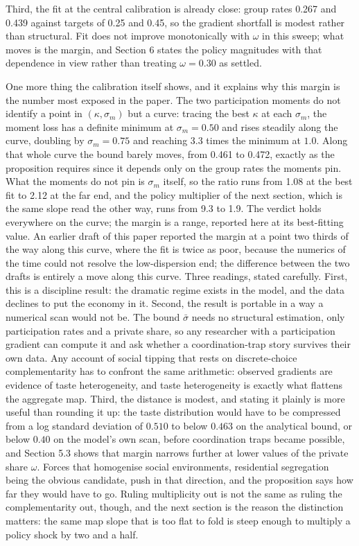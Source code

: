 \documentclass[11pt]{article}
\begin{document}
Third, the fit at the central calibration is already close: group rates 0.267 and 0.439 against targets of 0.25 and 0.45, so the gradient shortfall is modest rather than structural. Fit does not improve monotonically with $\omega$ in this sweep; what moves is the margin, and Section 6 states the policy magnitudes with that dependence in view rather than treating $\omega = 0.30$ as settled.

One more thing the calibration itself shows, and it explains why this margin is the number most exposed in the paper. The two participation moments do not identify a point in $(\kappa, \sigma_m)$ but a curve: tracing the best $\kappa$ at each $\sigma_m$, the moment loss has a definite minimum at $\sigma_m = 0.50$ and rises steadily along the curve, doubling by $\sigma_m = 0.75$ and reaching 3.3 times the minimum at $1.0$. Along that whole curve the bound barely moves, from 0.461 to 0.472, exactly as the proposition requires since it depends only on the group rates the moments pin. What the moments do not pin is $\sigma_m$ itself, so the ratio runs from 1.08 at the best fit to 2.12 at the far end, and the policy multiplier of the next section, which is the same slope read the other way, runs from 9.3 to 1.9. The verdict holds everywhere on the curve; the margin is a range, reported here at its best-fitting value. An earlier draft of this paper reported the margin at a point two thirds of the way along this curve, where the fit is twice as poor, because the numerics of the time could not resolve the low-dispersion end; the difference between the two drafts is entirely a move along this curve. Three readings, stated carefully. First, this is a discipline result: the dramatic regime exists in the model, and the data declines to put the economy in it. Second, the result is portable in a way a numerical scan would not be. The bound $\bar\sigma$ needs no structural estimation, only participation rates and a private share, so any researcher with a participation gradient can compute it and ask whether a coordination-trap story survives their own data. Any account of social tipping that rests on discrete-choice complementarity has to confront the same arithmetic: observed gradients are evidence of taste heterogeneity, and taste heterogeneity is exactly what flattens the aggregate map. Third, the distance is modest, and stating it plainly is more useful than rounding it up: the taste distribution would have to be compressed from a log standard deviation of $0.510$ to below $0.463$ on the analytical bound, or below $0.40$ on the model's own scan, before coordination traps became possible, and Section 5.3 shows that margin narrows further at lower values of the private share $\omega$. Forces that homogenise social environments, residential segregation being the obvious candidate, push in that direction, and the proposition says how far they would have to go. Ruling multiplicity out is not the same as ruling the complementarity out, though, and the next section is the reason the distinction matters: the same map slope that is too flat to fold is steep enough to multiply a policy shock by two and a half.
\end{document}
